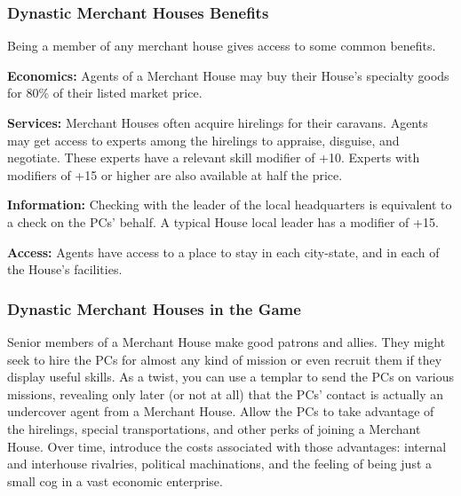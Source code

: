 \subsubsection{Dynastic Merchant Houses Benefits}
Being a member of any merchant house gives access to some common benefits.

\textbf{Economics:} Agents of a Merchant House may buy their House's specialty goods for 80\% of their listed market price.

\textbf{Services:} Merchant Houses often acquire hirelings for their caravans. Agents may get access to experts among the hirelings to appraise, disguise, and negotiate. These experts have a relevant skill modifier of +10. Experts with modifiers of +15 or higher are also available at half the price.

\textbf{Information:} Checking with the leader of the local headquarters is equivalent to a  check on the PCs' behalf. A typical House local leader has a  modifier of +15.

\textbf{Access:} Agents have access to a place to stay in each city-state, and in each of the House's facilities.

\subsubsection{Dynastic Merchant Houses in the Game}
Senior members of a Merchant House make good patrons and allies. They might seek to hire the PCs for almost any kind of mission or even recruit them if they display useful skills. As a twist, you can use a templar to send the PCs on various missions, revealing only later (or not at all) that the PCs' contact is actually an undercover agent from a Merchant House. Allow the PCs to take advantage of the hirelings, special transportations, and other perks of joining a Merchant House. Over time, introduce the costs associated with those advantages: internal and interhouse rivalries, political machinations, and the feeling of being just a small cog in a vast economic enterprise.








